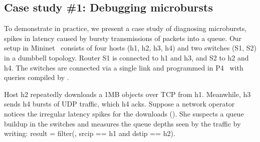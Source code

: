 \subsection{Case study \#1: Debugging microbursts}
\label{s:eval:mininet}
\label{sec:eval:mininet}

To demonstrate \TheSystem in practice, we present a case study of
diagnosing microbursts, \ie spikes in latency caused by bursty
transmissions of packets into a queue.
Our setup in Mininet~\cite{mininet} consists of four hosts
({\ct h1, h2, h3, h4}) and two switches ({\ct S1, S2}) in a dumbbell topology.
Router {\ct S1} is connected to {\ct h1} and {\ct h3},
and {\ct S2} to {\ct h2} and {\ct h4}.
The switches are connected via a single link and
programmed in P4~\cite{p4-bmv2} with queries compiled by \TheSystem.

Host {\ct h2} repeatedly downloads a 1MB objects over TCP from {\ct h1}.
Meanwhile, {\ct h3} sends {\ct h4} bursts of UDP traffic, which
{\ct h4} acks.  Suppose a network operator notices the irregular latency
spikes for the downloads (). She suspects a queue buildup
in the switches and measures the queue depths seen by the traffic by writing:
{\ct result = filter(\pktlog, srcip == h1 and dstip == h2).}


